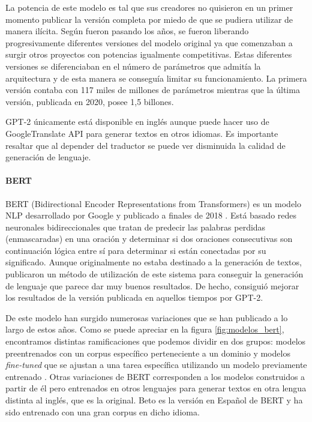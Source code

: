 La potencia de este modelo es tal que sus creadores no quisieron en un primer momento publicar la versión completa por miedo de que se pudiera utilizar de manera ilícita. Según fueron pasando los años, se fueron liberando progresivamente diferentes versiones del modelo original ya que comenzaban a surgir otros proyectos con potencias igualmente competitivas. Estas diferentes versiones se diferenciaban en el número de parámetros que admitía la arquitectura y de esta manera se conseguía limitar su funcionamiento. La primera versión contaba con 117 miles de millones de parámetros mientras que la última versión, publicada en 2020, posee 1,5 billones.

GPT-2 únicamente está disponible en inglés aunque puede hacer uso de GoogleTranslate API para generar textos en otros idiomas. Es importante resaltar que al depender del traductor se puede ver disminuida la calidad de generación de lenguaje.


\paragraph{BERT}\hfill

BERT (Bidirectional Encoder Representations from Transformers) es un modelo NLP desarrollado por Google y publicado a finales de 2018 \citep{Devlin2019BERTPO}. Está basado redes neuronales bidireccionales que tratan de predecir las palabras perdidas (enmascaradas) en una oración y determinar si dos oraciones consecutivas son continuación lógica entre sí para determinar si están conectadas por su significado. Aunque originalmente no estaba destinado a la generación de textos, \cite{wang-cho-2019-bert} publicaron un método de utilización de este sistema para conseguir la generación de lenguaje que parece dar muy buenos resultados. De hecho, consiguió mejorar los resultados de la versión publicada en aquellos tiempos por GPT-2. 

De este modelo han surgido numerosas variaciones que se han publicado a lo largo de estos años. Como se puede apreciar en la figura \ref{fig:modelos_bert}, encontramos distintas ramificaciones que podemos dividir en dos grupos: modelos preentrenados con un corpus específico perteneciente a un dominio y modelos \textit{fine-tuned} que se ajustan a una tarea específica utilizando un modelo previamente entrenado \citep{rajasekharan_2019}.
Otras variaciones de BERT corresponden a los modelos construidos a partir de él pero entrenados en otros lenguajes para generar textos en otra lengua distinta al inglés, que es la original. Beto es la versión en Español de BERT \citep{CaneteCFP2020} y ha sido entrenado con una gran corpus en dicho idioma.

